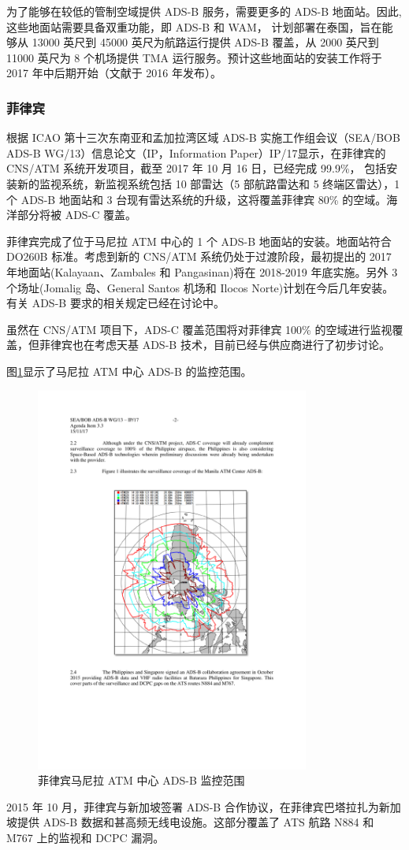 
为了能够在较低的管制空域提供 ADS-B 服务，需要更多的 ADS-B 地面站。因此,这些地面站需要具备双重功能，即 ADS-B 和 WAM， 计划部署在泰国，旨在能够从 13000 英尺到 45000 英尺为航路运行提供 ADS-B 覆盖，从 2000 英尺到 11000 英尺为 8 个机场提供 TMA 运行服务。预计这些地面站的安装工作将于 2017 年中后期开始（文献于 2016 年发布）。

\subsubsection{菲律宾}

根据 ICAO 第十三次东南亚和孟加拉湾区域 ADS-B 实施工作组会议（SEA/BOB ADS-B WG/13）信息论文（IP，Information Paper）IP/17显示，在菲律宾的 \acs{CNS}/ATM 系统开发项目，截至 2017 年 10 月 16 日，已经完成 99.9\%， 包括安装新的监视系统，新监视系统包括 10 部雷达（5 部航路雷达和 5 终端区雷达），1 个 ADS-B 地面站和 3 台现有雷达系统的升级，这将覆盖菲律宾 80\% 的空域。海洋部分将被 ADS-C 覆盖。

菲律宾完成了位于马尼拉 ATM 中心的 1 个 ADS-B 地面站的安装。地面站符合 DO260B 标准。考虑到新的 CNS/ATM 系统仍处于过渡阶段，最初提出的 2017 年地面站(Kalayaan、Zambales 和 Pangasinan)将在 2018-2019 年底实施。另外 3 个场址(Jomalig 岛、General Santos 机场和 Ilocos Norte)计划在今后几年安装。有关 ADS-B 要求的相关规定已经在讨论中。

虽然在 CNS/ATM 项目下，ADS-C 覆盖范围将对菲律宾 100\% 的空域进行监视覆盖，但菲律宾也在考虑天基 ADS-B 技术，目前已经与供应商进行了初步讨论。

图\ref{fig:phillipine}显示了马尼拉 ATM 中心 ADS-B 的监控范围。

\begin{figure}[!htb]
\centering
\includegraphics[width=9cm]{pic/phillipine.pdf}
\caption{菲律宾马尼拉 ATM 中心 ADS-B 监控范围\protect\footnotemark}
\label{fig:phillipine}
\end{figure}


2015 年 10 月，菲律宾与新加坡签署 ADS-B 合作协议，在菲律宾巴塔拉扎为新加坡提供 ADS-B 数据和甚高频无线电设施。这部分覆盖了 ATS 航路 N884 和 M767 上的监视和 \acs{DCPC} 漏洞。


